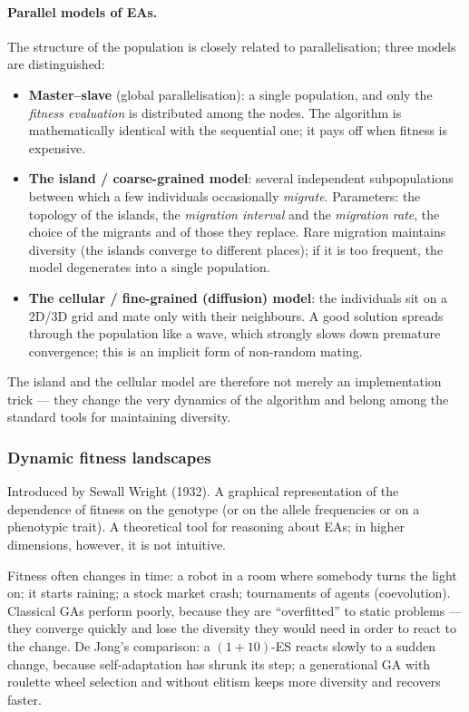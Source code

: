 \documentclass[11pt,a4paper]{article}
\theoremstyle{definition}
\providecommand{\uv}[1]{``#1''}
\begin{document}
\paragraph{Parallel models of EAs.} The structure of the population is closely
related to parallelisation; three models are distinguished:
\begin{itemize}
\item \textbf{Master--slave} (global parallelisation): a single population, and
  only the \emph{fitness evaluation} is distributed among the nodes. The
  algorithm is mathematically identical with the sequential one; it pays off
  when fitness is expensive.
\item \textbf{The island / coarse-grained model}: several independent
  subpopulations between which a few individuals occasionally \emph{migrate}.
  Parameters: the topology of the islands, the \emph{migration interval} and the
  \emph{migration rate}, the choice of the migrants and of those they replace.
  Rare migration maintains diversity (the islands converge to different places);
  if it is too frequent, the model degenerates into a single population.
\item \textbf{The cellular / fine-grained (diffusion) model}: the individuals sit
  on a 2D/3D grid and mate only with their neighbours. A good solution spreads
  through the population like a wave, which strongly slows down premature
  convergence; this is an implicit form of non-random mating.
\end{itemize}
The island and the cellular model are therefore not merely an implementation
trick --- they change the very dynamics of the algorithm and belong among the
standard tools for maintaining diversity.

\subsubsection{Dynamic fitness landscapes}

\begin{defbox}
Introduced by Sewall Wright (1932). A graphical representation of the dependence
of fitness on the genotype (or on the allele frequencies or on a phenotypic
trait). A theoretical tool for reasoning about EAs; in higher dimensions,
however, it is not intuitive.
\end{defbox}

Fitness often changes in time: a robot in a room where somebody turns the light
on; it starts raining; a stock market crash; tournaments of agents
(coevolution). Classical GAs perform poorly, because they are \uv{overfitted} to
static problems --- they converge quickly and lose the diversity they would need
in order to react to the change.
De Jong's comparison: a $(1+10)$-ES reacts slowly to a sudden change, because
self-adaptation has shrunk its step; a generational GA with roulette wheel
selection and without elitism keeps more diversity and recovers faster.
\end{document}
